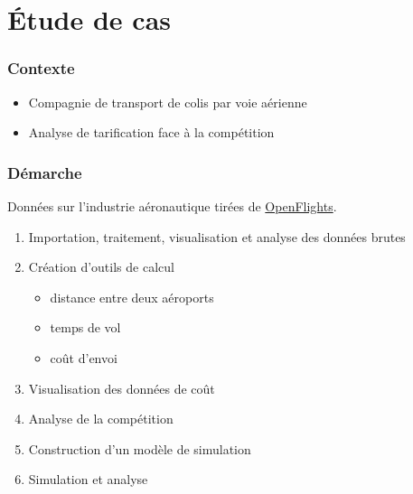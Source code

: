 \section{Étude de cas}

\begin{frame}
  \frametitle{Contexte}

  \begin{itemize}
  \item Compagnie de transport de colis par voie aérienne
  \item Analyse de tarification face à la compétition
  \end{itemize}
\end{frame}

\begin{frame}
  \frametitle{Démarche}

  Données sur l'industrie aéronautique tirées de
  \href{https://openflights.org/data.html}{OpenFlights}.

  \begin{enumerate}
  \item Importation, traitement, visualisation et analyse des données
    brutes
  \item Création d'outils de calcul
    \begin{itemize}
    \item distance entre deux aéroports
    \item temps de vol
    \item coût d'envoi
    \end{itemize}
  \item Visualisation des données de coût
  \item Analyse de la compétition
  \item Construction d'un modèle de simulation
  \item Simulation et analyse
  \end{enumerate}

  \pause
\end{frame}


